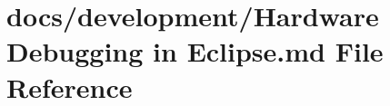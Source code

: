 \hypertarget{Hardware_01Debugging_01in_01Eclipse_8md}{\section{docs/development/\+Hardware Debugging in Eclipse.\+md File Reference}
\label{Hardware_01Debugging_01in_01Eclipse_8md}
}
